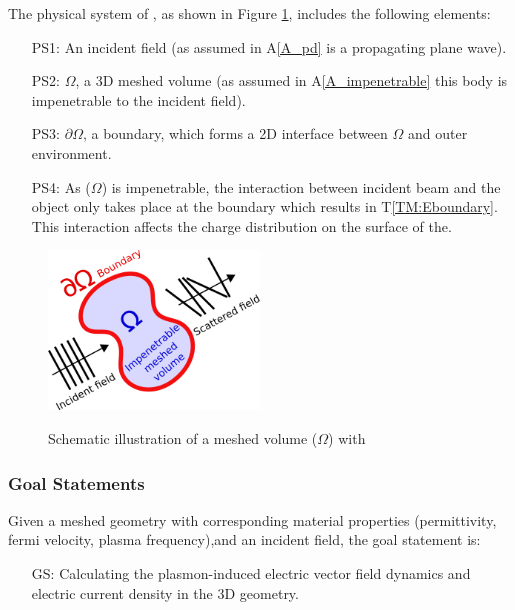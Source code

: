 \documentclass[12pt]{article}
\newcounter{goalnum} %
\begin{document}
The physical system of \progname{}, as shown in Figure \ref{fig:system},
includes the following elements:


\begin{itemize}

\item[PS1:] An incident field (as assumed in A\ref{A_pd} is a propagating plane wave).

\item[PS2:] $\Omega$, a 3D meshed volume (as assumed in A\ref{A_impenetrable} this body is impenetrable to the incident field). 

\item[PS3:] $\partial\Omega$, a boundary, which forms a 2D interface between $\Omega$ and outer environment.


\item[PS4:] As ($\Omega$) is impenetrable, the interaction between incident beam and the object only takes place at the boundary which results in T\ref{TM:Eboundary}. This interaction affects the charge distribution on the surface of the.

\end{itemize}


 \begin{figure}[h!]
 \begin{center}
 {
  \includegraphics[width=0.5\textwidth]{physical_system.png}
 }
 \caption{\label{fig:system} Schematic illustration of a meshed volume ($\Omega$) with  }
 \end{center}
 \end{figure}

\subsubsection{Goal Statements}
\label{goalstat}
Given a meshed geometry with corresponding material properties (permittivity, fermi velocity, plasma frequency),and an incident field, the goal statement is: 


\begin{itemize}

\item[GS\refstepcounter{goalnum}\thegoalnum \label{GS1}:] Calculating the plasmon-induced electric vector field dynamics and electric current density in the 3D geometry.

\end{itemize}
\end{document}
